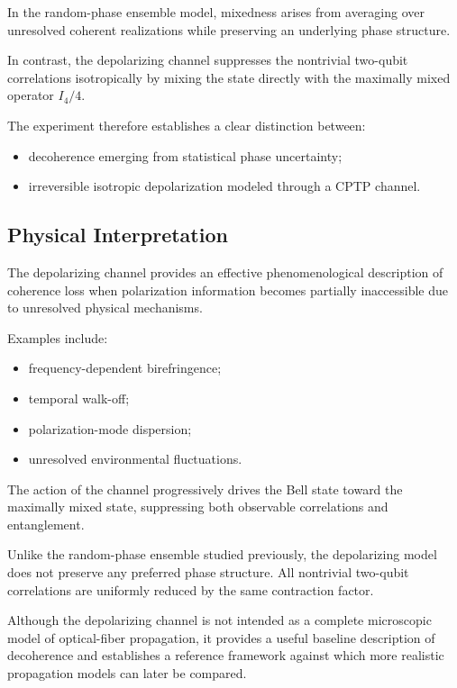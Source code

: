 In the random-phase ensemble model, mixedness arises from averaging over unresolved coherent realizations while preserving an underlying phase structure.

In contrast, the depolarizing channel suppresses the nontrivial two-qubit correlations isotropically by mixing the state directly with the maximally mixed operator \(I_4/4\).

The experiment therefore establishes a clear distinction between:

\begin{itemize}
    \item decoherence emerging from statistical phase uncertainty;
    \item irreversible isotropic depolarization modeled through a CPTP channel.
\end{itemize}


\subsection*{Physical Interpretation}

The depolarizing channel provides an effective phenomenological description of coherence loss when polarization information becomes partially inaccessible due to unresolved physical mechanisms.

Examples include:

\begin{itemize}
    \item frequency-dependent birefringence;
    \item temporal walk-off;
    \item polarization-mode dispersion;
    \item unresolved environmental fluctuations.
\end{itemize}

The action of the channel progressively drives the Bell state toward the maximally mixed state, suppressing both observable correlations and entanglement.

Unlike the random-phase ensemble studied previously, the depolarizing model does not preserve any preferred phase structure. All nontrivial two-qubit correlations are uniformly reduced by the same contraction factor.

Although the depolarizing channel is not intended as a complete microscopic model of optical-fiber propagation, it provides a useful baseline description of decoherence and establishes a reference framework against which more realistic propagation models can later be compared.